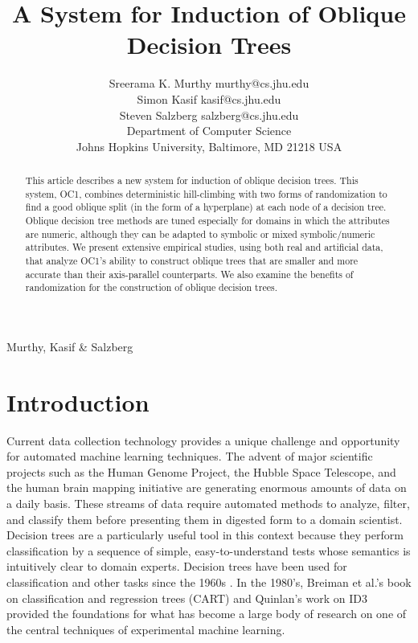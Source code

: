 
%
{Murthy, Kasif \& Salzberg}

\title {A System for Induction of Oblique Decision Trees}
\author {\name Sreerama K. Murthy \email murthy@cs.jhu.edu \\
         \name Simon Kasif \email kasif@cs.jhu.edu \\
         \name Steven Salzberg \email salzberg@cs.jhu.edu \\
         \addr Department of Computer Science \\
         Johns Hopkins University,
         Baltimore, MD 21218 USA}


\maketitle

\begin{abstract}
This article describes a new system for induction of oblique decision
trees.  This system, OC1, combines deterministic hill-climbing with
two forms of randomization to find a good oblique split (in the form
of a hyperplane) at each node of a decision tree.  Oblique decision
tree methods are tuned especially for domains in which the attributes
are numeric, although they can be adapted to symbolic or mixed
symbolic/numeric attributes.  We present extensive empirical studies,
using both real and artificial data, that analyze OC1's ability to
construct oblique trees that are smaller and more accurate than their
axis-parallel counterparts.  We also examine the benefits of
randomization for the construction of oblique decision trees.
\end{abstract}

\section{Introduction}
\label{section:intro}

Current data collection technology provides a unique challenge and
opportunity for automated machine learning techniques.  The advent of
major scientific projects such as the Human Genome Project, the Hubble
Space Telescope, and the human brain mapping initiative are generating
enormous amounts of data on a daily basis.  These streams of data
require automated methods to analyze, filter, and classify them before
presenting them in digested form to a domain scientist.  Decision
trees are a particularly useful tool in this context because they
perform classification by a sequence of simple, easy-to-understand
tests whose semantics is intuitively clear to domain experts.
Decision trees have been used for classification and other tasks
since the 1960s \cite{moret/82,safavin/landgrebe/91}.  In the 1980's,
Breiman et al.'s book on classification and regression trees (CART)
and Quinlan's work on ID3 \cite{quinlan/83,quinlan/86} provided the
foundations for what has become a large body of research on one of the
central techniques of experimental machine learning.


